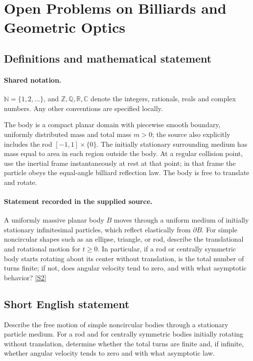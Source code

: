 \documentclass[11pt]{article}
\newcommand{\sref}[2]{\hyperlink{source:#1:#2}{[S#2]}}
\begin{document}
\section{Open Problems on Billiards and Geometric Optics}\label{statement}

\subsection{Definitions and mathematical statement}

\paragraph{Shared notation.}$\mathbb N=\{1,2,\ldots\}$, and $\mathbb Z,\mathbb Q,\mathbb R,\mathbb C$ denote the integers, rationals, reals and complex numbers. Any other conventions are specified locally.


The body is a compact planar domain with piecewise smooth boundary, uniformly distributed mass and total mass $m>0$; the source also explicitly includes the rod $[-1,1]\times\{0\}$. The initially stationary surrounding medium has mass equal to area in each region outside the body. At a regular collision point, use the inertial frame instantaneously at rest at that point; in that frame the particle obeys the equal-angle billiard reflection law. The body is free to translate and rotate.
\paragraph{Statement recorded in the supplied source.}
A uniformly massive planar body $B$ moves through a uniform medium of initially stationary infinitesimal particles, which reflect elastically from $\partial B$. For simple noncircular shapes such as an ellipse, triangle, or rod, describe the translational and rotational motion for $t\geq0$. In particular, if a rod or centrally symmetric body starts rotating about its center without translation, is the total number of turns finite; if not, does angular velocity tend to zero, and with what asymptotic behavior? \sref{statement}{2}
\subsection{Short English statement}
Describe the free motion of simple noncircular bodies through a stationary particle medium. For a rod and for centrally symmetric bodies initially rotating without translation, determine whether the total turns are finite and, if infinite, whether angular velocity tends to zero and with what asymptotic law.
\end{document}
